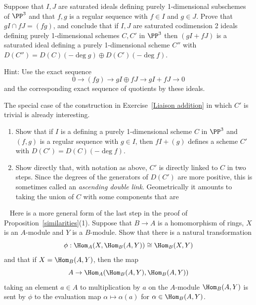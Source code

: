 \begin{exercise}
\label{Liaison addition}
Suppose that $I, J$ are saturated ideals defining purely 1-dimensional
%
subschemes of $\PP^3$
and that $f,g$ is a regular sequence with $f\in I$ and $g\in J$.
Prove that $g I \cap fJ = (fg)$, and conclude that if $I,J$ are saturated
codimension 2 ideals
defining purely 1-dimensional schemes $C,C'$ in $\PP^3$
then $(gI+fJ)$ is a saturated ideal defining a purely 1-dimensional
scheme $C''$ with $D(C'') = D(C)(-\!\deg g) \oplus D(C')(-\!\deg f)$.

Hint: Use the exact sequence
$$
0\to (fg) \to gI \oplus fJ \to gI+fJ \to 0
$$
and the corresponding exact sequence of quotients by these ideals.
\end{exercise}


\begin{exercise}\label{Basic double links}
The special case of the construction in Exercise~\ref{Liaison addition}
%
in which $C'$ is trivial is already interesting.

\begin{enumerate}
\item Show that if $I$ is a 
%
defining a purely 1-dimensional scheme $C$ in $\PP^3$
and $(f, g)$ is a regular sequence with $g\in I$,
then $fI+(g)$ defines a scheme $C'$ with $D(C') = D(C)(-\!\deg f)$.

\item Show directly that, with notation as above, $C'$ is directly
linked to $C$
in two steps. Since the degrees of the generators of $D(C')$ are more
positive, this
is sometimes called an \emph{ascending double link}. Geometrically it
%
amounts to taking the
union of $C$ with some	components that are 
%
\end{enumerate}
\end{exercise}

\begin{exercise}~\label{adjointness}
Here is a more general form of the last step in the proof of 
Proposition~\ref{similarities}(1). 
Suppose that $B\to A$ is a homomorphism
of rings, $X$ is an $A$-module and $Y$ is a
$B$-module. Show that there is a natural transformation
$$
\phi: \Hom_A(X, \Hom_B(A, Y)) \cong \Hom_B(X,Y)
$$
and that if $X = \Hom_B(A,Y)$, then the map
$$
A\to \Hom_A(\Hom_B(A,Y), \Hom_B(A, Y))
$$
taking an element $a\in A$ to multiplication by $a$ on the $A$-module
$\Hom_B(A, Y)$
is sent by $\phi$ to the evaluation map $\alpha \mapsto \alpha(a)$ for
$\alpha \in \Hom_B(A,Y)$.
\end{exercise}

